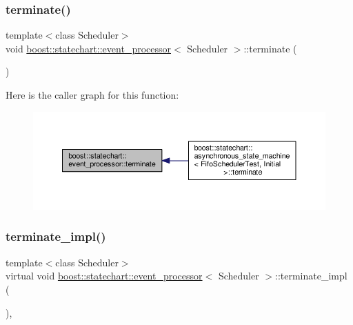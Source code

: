 \subsubsection{\texorpdfstring{terminate()}{terminate()}}
{\footnotesize\ttfamily template$<$class Scheduler$>$ \\
void \mbox{\hyperlink{classboost_1_1statechart_1_1event__processor}{boost\+::statechart\+::event\+\_\+processor}}$<$ Scheduler $>$\+::terminate (\begin{DoxyParamCaption}{ }\end{DoxyParamCaption})\hspace{0.3cm}{\ttfamily [inline]}}

Here is the caller graph for this function\+:
\nopagebreak
\begin{figure}[H]
\begin{center}
\leavevmode
\includegraphics[width=350pt]{classboost_1_1statechart_1_1event__processor_a9134afd6e3f693e035f35d3af434dee9_icgraph}
\end{center}
\end{figure}
\mbox{\label{classboost_1_1statechart_1_1event__processor_a3f5f4c757909fca5f389b485a789c24e}} 
\subsubsection{\texorpdfstring{terminate\+\_\+impl()}{terminate\_impl()}}
{\footnotesize\ttfamily template$<$class Scheduler$>$ \\
virtual void \mbox{\hyperlink{classboost_1_1statechart_1_1event__processor}{boost\+::statechart\+::event\+\_\+processor}}$<$ Scheduler $>$\+::terminate\+\_\+impl (\begin{DoxyParamCaption}{ }\end{DoxyParamCaption})\hspace{0.3cm}{\ttfamily [private]}, {}}



